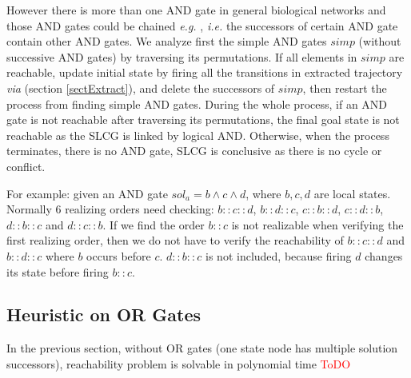 \documentclass[runningheads]{llncs}
\begin{document}

However there is more than one AND gate in general biological networks and those AND gates could be chained \textit{e.g.} \cite{samaga2009logic}, \textit{i.e.} the successors of certain AND gate contain other AND gates.
We analyze first the simple AND gates $simp$ (without successive AND gates) by traversing its permutations.
If all elements in $simp$ are reachable, update initial state by firing all the transitions in extracted trajectory \textit{via} (section \ref{sectExtract}), and delete the successors of $simp$, then restart the process from finding simple AND gates.
During the whole process, if an AND gate is not reachable after traversing its permutations, the final goal state is not reachable as the SLCG is linked by logical AND. 
Otherwise, when the process terminates, there is no AND gate, SLCG is conclusive as there is no cycle or conflict.


For example: given an AND gate $sol_a=b\land c\land d$, where $b,c,d$ are local states.
Normally 6 realizing orders need checking: $b::c::d$, $b::d::c$, $c::b::d$, $c::d::b$, $d::b::c$ and $d::c::b$. 
If we find the order $b::c$ is not realizable when verifying the first realizing order, then we do not have to verify the reachability of $b::c::d$ and $b::d::c$ where $b$ occurs before $c$. $d::b::c$ is not included, because firing $d$ changes its state before firing $b::c$.



\subsection{Heuristic on OR Gates}\label{sectheuristic}
In the previous section, without OR gates (one state node has multiple solution successors), reachability problem is solvable in polynomial time \textcolor{red}{ToDO}%
\end{document}

